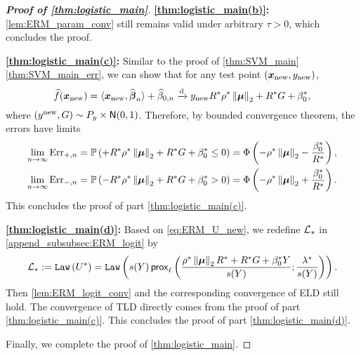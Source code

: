 \begin{proof}[\textbf{Proof of \cref{thm:logistic_main}}]
\vspace{0.5\baselineskip}
\noindent
\textbf{\ref{thm:logistic_main(b)}:} \cref{lem:ERM_param_conv} still remains valid under arbitrary $\tau > 0$, which concludes the proof.

\vspace{0.5\baselineskip}
\noindent
\textbf{\ref{thm:logistic_main(c)}:} Similar to the proof of \cref{thm:SVM_main}\ref{thm:SVM_main_err}, we can show that for any test point $(\text{\boldmath $x$}_\mathrm{new}, y_\mathrm{new})$,
\begin{equation*}
        \widehat f(\text{\boldmath $x$}_\mathrm{new}) = \langle \text{\boldmath $x$}_\mathrm{new}, \widehat{{\boldsymbol{\beta}}}_n \rangle + \widehat\beta_{0,n}
        \xrightarrow{\mathrm{d}} y_\mathrm{new} R^* \rho^* \left\|{\text{\boldmath $\mu$}}\right\|_2 + R^* G + \beta_{0}^*,
\end{equation*}
where $(y^\mathrm{new}, G) \sim P_y \times {\sf N}(0, 1)$. Therefore, by bounded convergence theorem, the errors have limits
\begin{align*}
        \lim_{n \to \infty} \mathrm{Err}_{+,n} & = \mathbb{P}\left( + R^*\rho^* \left\|{\text{\boldmath $\mu$}}\right\|_2 + R^*G + \beta_{0}^* \le 0 \right)
        = \Phi \left(- \rho^* \left\|{\text{\boldmath $\mu$}}\right\|_2  - \frac{\beta_0^*}{R^*} \right), \\
        \lim_{n \to \infty} \mathrm{Err}_{-,n} & = \mathbb{P}\left( - R^*\rho^* \left\|{\text{\boldmath $\mu$}}\right\|_2 + R^*G + \beta_{0}^* >  0 \right)
        = \Phi \left(- \rho^* \left\|{\text{\boldmath $\mu$}}\right\|_2  + \frac{\beta_0^*}{R^*} \right).
\end{align*}
This concludes the proof of part \ref{thm:logistic_main(c)}.

\vspace{0.5\baselineskip}
\noindent
\textbf{\ref{thm:logistic_main(d)}:} Based on \cref{eq:ERM_U_new}, we redefine $\mathcal{L}_*$ in \cref{append_subsubsec:ERM_logit} by
\begin{equation*}
    \mathcal{L}_* := \mathtt{Law} \, (U^*)
    =
    \mathtt{Law} \left( 
    s(Y) \, \mathsf{prox}_{\ell}\left( \frac{\rho^*\left\|{{\boldsymbol{\mu}}}\right\|_2 R^* + R^*G + \beta_0^* Y}{s(Y)}; \frac{\lambda^*}{s(Y)} \right)
    \right).
\end{equation*}
Then \cref{lem:ERM_logit_conv} and the corresponding convergence of ELD still hold. The convergence of TLD directly comes from the proof of part \ref{thm:logistic_main(c)}. This concludes the proof of part \ref{thm:logistic_main(d)}.

Finally, we complete the proof of \cref{thm:logistic_main}.
\end{proof}












